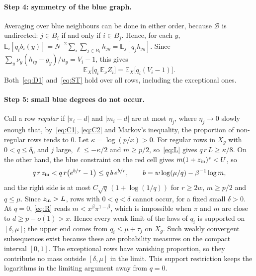 \documentclass[11pt]{article}
\theoremstyle{definition}
\theoremstyle{remark}
\newcommand{\E}{\mathbb{E}}
\begin{document}
\paragraph{Step 4: symmetry of the blue graph.} Averaging over blue neighbours can be done in either order,
because $\mathcal B$ is undirected: $j\in B_i$ if and only if $i\in B_j$. Hence, for
each $y$, $\E_i[q_ib_i(y)]=N^{-2}\sum_i\sum_{j\in B_i}h_{jy}=\E_j[q_jh_{jy}]$. Since
$\sum_y\nu_y(h_{iy}-g_y)/u_y=V_i-1$, this gives
\begin{equation}\label{eq:ST}
\E_X\big[q_i\,\E_\nu Z_i\big]=\E_X\big[q_i(V_i-1)\big].
\end{equation}
Both~\eqref{eq:D1} and~\eqref{eq:ST} hold over all rows, including the exceptional ones.

\paragraph{Step 5: small blue degrees do not occur.} Call a row \emph{regular} if $|\pi_i-d|$ and $|m_i-d|$ are at most
$\eta_j$, where $\eta_j\to0$ slowly enough that, by~\eqref{eq:C1}, \eqref{eq:C2} and Markov's inequality,
the proportion of non-regular rows tends to $0$. Let $\kappa=\log(p/x)>0$. For regular rows in $X_g$ with
$0<q\le\delta_0$ and $j$ large, $\ell\le-\kappa/2$ and $m\ge p/2$, so~\eqref{eq:L} gives $q\,r\,L\ge\kappa/8$. On the
other hand, the blue constraint on the red cell gives $m(1+z_{\rm in})^s<U$, so
\[
q\,r\,z_{\rm in}<q\,r\big(e^{b/r}-1\big)\le q\,b\,e^{b/r},\qquad b=w\log(\mu/q)-\beta^{-1}\log m,
\]
and the right side is at most $C\sqrt q\,(1+\log(1/q))$ for $r\ge2w$, $m\ge p/2$ and $q\le\mu$. Since $z_{\rm in}>L$,
rows with $0<q<\delta$ cannot occur, for a fixed small $\delta>0$. At $q=0$, \eqref{eq:R} reads
$m<x^\beta\pi^{1-\beta}$, which is impossible when $\pi$ and $m$ are close to $d\ge p-o(1)>x$. Hence every weak limit
of the laws of $q_i$ is supported on $[\delta,\mu]$; the upper end comes from $q_i\le\mu+\tau_j$ on $X_g$.
Such weakly convergent subsequences exist because these are probability measures on the compact interval $[0,1]$.
The exceptional rows have vanishing proportion, so they contribute no mass outside $[\delta,\mu]$ in the limit.
This support restriction keeps the logarithms in the limiting argument away from $q=0$.
\end{document}
